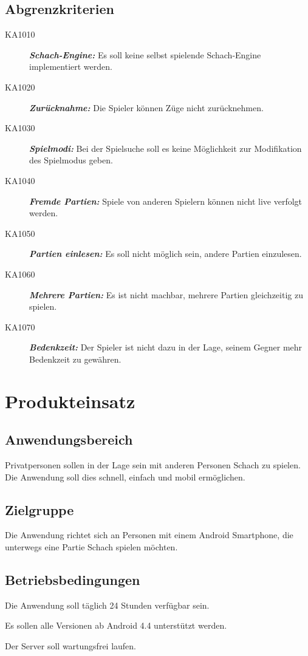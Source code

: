 \documentclass[parskip=full]{scrartcl}
\begin{document}
\subsection{Abgrenzkriterien}
\begin{description}
\item[KA1010] \textbf{\textit{\gls{Schach-Engine}:}} Es soll keine selbst spielende \gls{Schach-Engine} implementiert werden.
\item[KA1020] \textbf{\textit{Zurücknahme:}} Die Spieler können Züge nicht zurücknehmen.
\item[KA1030] \textbf{\textit{Spielmodi:}} Bei der Spielsuche soll es keine Möglichkeit zur Modifikation des Spielmodus geben.
\item[KA1040] \textbf{\textit{Fremde Partien:}} Spiele von anderen \gls{Spieler}n können nicht live verfolgt werden.
\item[KA1050] \textbf{\textit{Partien einlesen:}} Es soll nicht möglich sein, andere Partien einzulesen.
\item[KA1060] \textbf{\textit{Mehrere Partien:}} Es ist nicht machbar, mehrere Partien gleichzeitig zu spielen.
\item[KA1070] \textbf{\textit{\gls{Bedenkzeit}:}} Der Spieler ist nicht dazu in der Lage, seinem Gegner mehr \gls{Bedenkzeit} zu gewähren.
\end{description}
\newpage
\section{Produkteinsatz}
	\subsection{Anwendungsbereich}
		
			Privatpersonen sollen in der Lage sein mit anderen Personen \gls{Schach} zu spielen. Die Anwendung soll dies schnell, einfach und mobil ermöglichen.	
		
	\subsection{Zielgruppe}
		
			Die Anwendung richtet sich an Personen mit einem Android \gls{Smartphone}, die unterwegs eine Partie \gls{Schach} spielen möchten.
		
	\subsection{Betriebsbedingungen}
		\begin{description}
			\item Die Anwendung soll täglich 24 Stunden verfügbar sein.
			\item Es sollen alle Versionen ab Android 4.4 unterstützt werden.
			\item Der Server soll wartungsfrei laufen.	
		\end{description}
	\newpage
\end{document}
